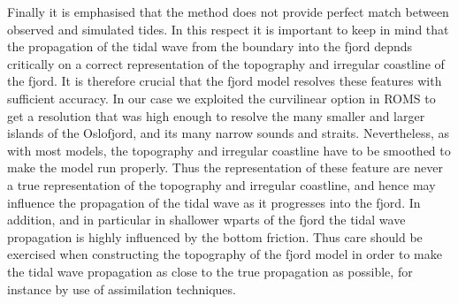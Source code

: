 Finally it is emphasised that the method does not provide perfect match between observed and simulated tides. In this respect it is important to keep in mind that the propagation of the tidal wave from the boundary into the fjord depnds critically on a correct representation of the topography and irregular coastline of the fjord. It is therefore crucial that the fjord model resolves these features with sufficient accuracy. In our case we exploited the curvilinear option in ROMS to get a resolution that was high enough to resolve the many smaller and larger islands of the Oslofjord, and its many narrow sounds and straits. Nevertheless, as with most models, the topography and irregular coastline have to be smoothed to make the model run properly. Thus the representation of these feature are never a true representation of the topography and irregular coastline, and hence may influence the propagation of the tidal wave as it progresses into the fjord. In addition, and in particular in shallower wparts of the fjord the tidal wave propagation is highly influenced by the bottom friction. Thus care should be exercised when constructing the topography of the fjord model in order to make the tidal wave propagation as close to the true propagation as possible, for instance by use of assimilation techniques.
